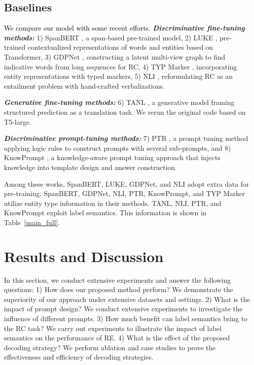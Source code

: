 \documentclass[11pt]{article}
\begin{document}
\subsection{Baselines}

\textcolor{black}{We compare our model with some recent efforts.}
\noindent\textbf{ \textit{Discriminative fine-tuning methods:}} 1) SpanBERT \cite{joshi-etal-2020-spanbert}, a span-based pre-trained model, 2) LUKE \cite{yamada-etal-2020-luke}, pre-trained contextualized representations of words and entities based on Transformer, 3) GDPNet \cite{DBLP:conf/aaai/XueSZC21}, 
constructing a latent multi-view graph to find indicative words from long sequences for RC, 4) TYP Marker \cite{DBLP:journals/corr/abs-2102-01373}, incorporating entity representations with typed markers, 5) NLI \cite{DBLP:conf/emnlp/SainzLLBA21}, reformulating RC as an entailment problem with hand-crafted verbalizations. 

\noindent\textbf{ \textit{Generative fine-tuning methods:} } 6) TANL \cite{DBLP:conf/iclr/PaoliniAKMAASXS21}, a generative model framing structured prediction as a translation task. We rerun the original code based on T5-large.

\noindent\textbf{ \textit{Discriminative prompt-tuning methods:}} 
7) PTR \cite{DBLP:journals/corr/abs-2105-11259}, a prompt tuning method applying logic rules to construct prompts with
several sub-prompts, and 8) KnowPrompt \cite{DBLP:journals/corr/abs-2104-07650}, a knowledge-aware prompt tuning approach that injects knowledge into template design and answer construction. 

Among these works, SpanBERT, LUKE, GDPNet, and NLI adopt extra data for pre-training. SpanBERT, GDPNet, NLI, PTR, KnowPrompt, and TYP Marker utilize entity type information in their methods. TANL, NLI, PTR, and KnowPrompt exploit label semantics. This information is shown in Table~\ref{main_full}.

\section{Results and Discussion}

In this section, we conduct extensive experiments and answer the following questions: 
1) How does our proposed method perform? We demonstrate the superiority of our approach under extensive datasets and settings.
2) What is the impact of prompt design? We conduct extensive experiments to investigate the influence of different prompts.
3) How much benefit can label semantics bring to the RC task? We carry out experiments to illustrate the impact of label semantics on the performance of RE. 
4) What is the effect of the proposed decoding strategy? We perform ablation and case studies to prove the effectiveness and efficiency of decoding strategies.
\end{document}
